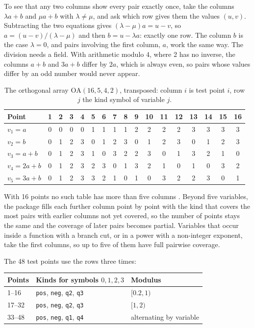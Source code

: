 \documentclass[11pt]{amsart}
\theoremstyle{definition}
\theoremstyle{remark}
\begin{document}
To see that any two columns show every pair exactly once, take the columns
$\lambda a + b$ and $\mu a + b$ with $\lambda \ne \mu$, and ask which row
gives them the values $(u, v)$. Subtracting the two equations gives
$(\lambda - \mu)a = u - v$, so $a = (u - v)/(\lambda - \mu)$ and then
$b = u - \lambda a$: exactly one row. The column $b$ is the case
$\lambda = 0$, and pairs involving the first column, $a$, work the same way. The division needs a field. With arithmetic modulo 4,
where 2 has no inverse, the columns $a + b$ and $3a + b$ differ by $2a$,
which is always even, so pairs whose values differ by an odd number would
never appear.

\begin{table}[ht]
\caption{The orthogonal array $\mathrm{OA}(16,5,4,2)$, transposed: column
$i$ is test point $i$, row $j$ the kind symbol of variable $j$.}
\label{tab:oa}
\small
\setlength{\tabcolsep}{4pt}
\begin{tabular}{@{}l*{16}{c}@{}}
\toprule
Point & 1 & 2 & 3 & 4 & 5 & 6 & 7 & 8 & 9 & 10 & 11 & 12 & 13 & 14 & 15 & 16 \\
\midrule
$v_1 = a$      & 0&0&0&0&1&1&1&1&2&2&2&2&3&3&3&3 \\
$v_2 = b$      & 0&1&2&3&0&1&2&3&0&1&2&3&0&1&2&3 \\
$v_3 = a + b$  & 0&1&2&3&1&0&3&2&2&3&0&1&3&2&1&0 \\
$v_4 = 2a + b$ & 0&1&2&3&2&3&0&1&3&2&1&0&1&0&3&2 \\
$v_5 = 3a + b$ & 0&1&2&3&3&2&1&0&1&0&3&2&2&3&0&1 \\
\bottomrule
\end{tabular}
\end{table}

With 16 points no such table has more than five columns
\cite{HedayatSloaneStufken99}. Beyond five variables, the package fills each
further column point by point with the kind that covers the most pairs with
earlier columns not yet covered, so the number of points stays the same and
the coverage of later pairs becomes partial. Variables that occur inside a
function with a branch cut, or in a power with a non-integer exponent, take
the first columns, so up to five of them have full pairwise coverage.

The 48 test points use the rows three times:

\begin{center}
\small
\begin{tabular}{@{}lll@{}}
\toprule
Points & Kinds for symbols $0,1,2,3$ & Modulus \\
\midrule
1--16 & \texttt{pos}, \texttt{neg}, \texttt{q2}, \texttt{q3} & $[0.2,1)$ \\
17--32 & \texttt{pos}, \texttt{neg}, \texttt{q2}, \texttt{q3} & $[1,2)$ \\
33--48 & \texttt{pos}, \texttt{neg}, \texttt{q1}, \texttt{q4} & alternating by variable \\
\bottomrule
\end{tabular}
\end{center}
\end{document}
